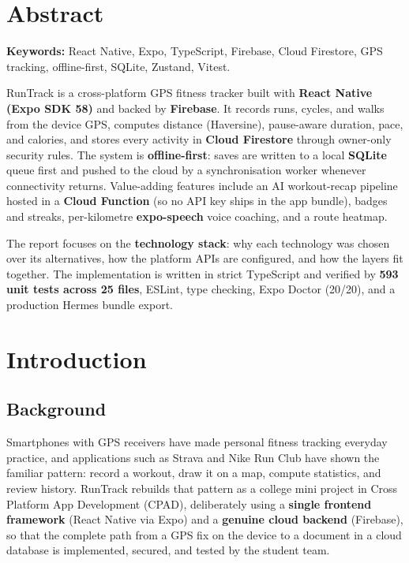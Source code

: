 \documentclass[12pt, a4paper]{report}
\newcommand{\courseTitle}{Cross Platform App Development (CPAD)}
\newcommand{\starchapter}[1]{%
  \chapter*{#1}%
  \markboth{#1}{#1}%
  \addcontentsline{toc}{chapter}{#1}}
\begin{document}
\starchapter{Abstract}
\vspace{0.4cm}
\noindent
\textbf{Keywords:} React Native, Expo, TypeScript, Firebase, Cloud Firestore,
GPS tracking, offline-first, SQLite, Zustand, Vitest.

\vspace{0.5cm}
\noindent
RunTrack is a cross-platform GPS fitness tracker built with \textbf{React
Native (Expo SDK 58)} and backed by \textbf{Firebase}. It records runs,
cycles, and walks from the device GPS, computes distance (Haversine),
pause-aware duration, pace, and calories, and stores every activity in
\textbf{Cloud Firestore} through owner-only security rules. The system is
\textbf{offline-first}: saves are written to a local \textbf{SQLite} queue
first and pushed to the cloud by a synchronisation worker whenever
connectivity returns. Value-adding features include an AI workout-recap
pipeline hosted in a \textbf{Cloud Function} (so no API key ships in the
app bundle), badges and streaks, per-kilometre \textbf{expo-speech} voice
coaching, and a route heatmap.

\vspace{0.4cm}
\noindent
The report focuses on the \textbf{technology stack}: why each technology was
chosen over its alternatives, how the platform APIs are configured, and how
the layers fit together. The implementation is written in strict TypeScript
and verified by \textbf{593 unit tests across 25 files}, ESLint, type
checking, Expo Doctor (20/20), and a production Hermes bundle export.

\cleardoublepage
\tableofcontents
\cleardoublepage
\listoffigures
\cleardoublepage
\listoftables

\setcounter{page}{1}

\chapter{Introduction}

\section{Background}
Smartphones with GPS receivers have made personal fitness tracking everyday
practice, and applications such as Strava and Nike Run Club have shown the
familiar pattern: record a workout, draw it on a map, compute statistics, and
review history. RunTrack rebuilds that pattern as a college mini project in
\courseTitle, deliberately using a \textbf{single frontend framework}
(React Native via Expo) and a \textbf{genuine cloud backend} (Firebase), so
that the complete path from a GPS fix on the device to a document in a cloud
database is implemented, secured, and tested by the student team.
\end{document}
